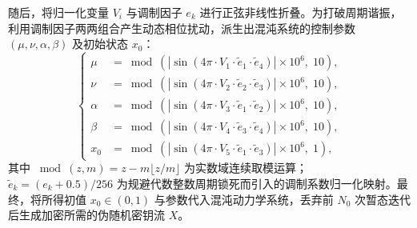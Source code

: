 随后，将归一化变量 $V_i$ 与调制因子 $e_k$ 进行正弦非线性折叠。为打破周期谐振，利用调制因子两两组合产生动态相位扰动，派生出混沌系统的控制参数 $(\mu, \nu, \alpha, \beta)$ 及初始状态 $x_0$：
\begin{equation}
\left\{
\begin{aligned}
    \mu   &= \bmod\left( \left| \sin\left( 4\pi \cdot V_1 \cdot \tilde{e}_1 \cdot \tilde{e}_4 \right) \right| \times 10^6,\; 10 \right), \\
    \nu   &= \bmod\left( \left| \sin\left( 4\pi \cdot V_2 \cdot \tilde{e}_2 \cdot \tilde{e}_3 \right) \right| \times 10^6,\; 10 \right), \\
    \alpha &= \bmod\left( \left| \sin\left( 4\pi \cdot V_3 \cdot \tilde{e}_1 \cdot \tilde{e}_2 \right) \right| \times 10^6,\; 10 \right), \\
    \beta  &= \bmod\left( \left| \sin\left( 4\pi \cdot V_4 \cdot \tilde{e}_3 \cdot \tilde{e}_4 \right) \right| \times 10^6,\; 10 \right), \\
    x_0    &= \bmod\left( \left| \sin\left( 4\pi \cdot V_5 \cdot \tilde{e}_1 \cdot \tilde{e}_3 \right) \right| \times 10^6,\; 1 \right),
\end{aligned}
\right.
\label{eq:params_v3}
\end{equation}
其中 $\bmod(z, m) = z - m\lfloor z/m \rfloor$ 为实数域连续取模运算；$\tilde{e}_k = (e_k + 0.5) / 256$ 为规避代数整数周期锁死而引入的调制系数归一化映射。最终，将所得初值 $x_0 \in (0, 1)$ 与参数代入混沌动力学系统，丢弃前 $N_0$ 次暂态迭代后生成加密所需的伪随机密钥流 $X$。


